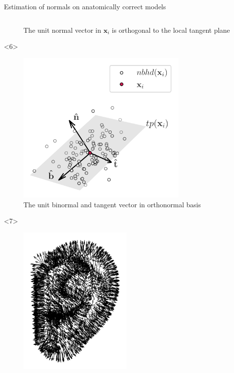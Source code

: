 \documentclass[xcolor=dvipsnames,10pt]{beamer}
\begin{document}
\begin{frame}{Estimation of normals on anatomically correct models}
\begin{columns}[c]
\begin{column}{0.5\textwidth}
\begin{onlyenv}
\begin{center}
\begin{figure}
                    \caption{The unit normal vector in $\mathbf{x}_i$ is orthogonal to the local tangent plane}
                \end{figure}
                \end{center}
            \end{onlyenv}
            \begin{onlyenv}<6>
                \begin{center}
                \begin{figure}
                    \includegraphics[width=0.75\textwidth]{artwork/orthogonal_set_4.pdf}
                    \caption{The unit binormal and tangent vector in orthonormal basis}
                \end{figure}
                \end{center}
            \end{onlyenv}
            \begin{onlyenv}<7>
                \begin{center}
                \begin{figure}
                    \includegraphics[width=0.5\textwidth]{artwork/ear_pcd_n.pdf}

\end{figure}
\end{center}
\end{onlyenv}
\end{column}
\end{columns}
\end{frame}
\end{document}
